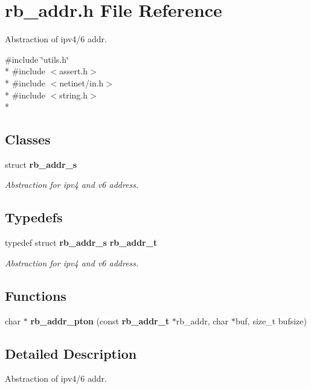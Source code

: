 \section{rb\+\_\+addr.\+h File Reference}
\label{rb__addr_8h}


Abstraction of ipv4/6 addr.  


{\ttfamily \#include \char`\"{}utils.\+h\char`\"{}}\\*
{\ttfamily \#include $<$assert.\+h$>$}\\*
{\ttfamily \#include $<$netinet/in.\+h$>$}\\*
{\ttfamily \#include $<$string.\+h$>$}\\*
\subsection*{Classes}
\begin{DoxyCompactItemize}
\item 
struct {\bf rb\+\_\+addr\+\_\+s}
\begin{DoxyCompactList}\small\item\em Abstraction for ipv4 and v6 address. \end{DoxyCompactList}\end{DoxyCompactItemize}
\subsection*{Typedefs}
\begin{DoxyCompactItemize}
\item 
typedef struct {\bf rb\+\_\+addr\+\_\+s} {\bf rb\+\_\+addr\+\_\+t}
\begin{DoxyCompactList}\small\item\em Abstraction for ipv4 and v6 address. \end{DoxyCompactList}\end{DoxyCompactItemize}
\subsection*{Functions}
\begin{DoxyCompactItemize}
\item 
char $\ast$ {\bf rb\+\_\+addr\+\_\+pton} (const {\bf rb\+\_\+addr\+\_\+t} $\ast$rb\+\_\+addr, char $\ast$buf, size\+\_\+t bufsize)
\end{DoxyCompactItemize}


\subsection{Detailed Description}
Abstraction of ipv4/6 addr. 



